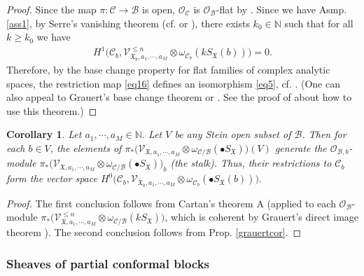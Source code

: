 \documentclass[11pt,b5paper,notitlepage]{article}
\theoremstyle{definition}
\theoremstyle{plain}
\newtheorem{co}[df]{Corollary}
\newcommand{\mc}{\mathcal}
\newcommand{\SV}{\mathscr{V}}
\newcommand{\blt}{\bullet}
\newcommand{\Nbb}{\mathbb N}
\newcommand{\<}{\left\langle}
\renewcommand{\>}{\right\rangle}
\newcommand{\MC}{\mathcal{C}}
\newcommand{\MB}{\mathcal{B}}
\newcommand{\fx}{\mathfrak{X}}
\numberwithin{equation}{section}
\begin{document}
\begin{proof}
Since the map $\pi:\mc C\rightarrow\mc B$ is open, $\mc O_{\mc C}$ is $\mc O_{\mc B}$-flat by \cite[Sec. 3.20]{Fis76}. Since we have Asmp. \ref{ass1}, by Serre's vanishing theorem (cf. \cite[Prop. 5.2.7]{Huy} or \cite[Thm. IV.2.1]{BaSt}), there exists $k_0\in\Nbb$ such that for all $k\geq k_0$ we have
\begin{align}\label{eq14}
H^1\big(\MC_b,\SV_{\fx_b,a_1,\cdots,a_M}^{\leq n}\otimes \omega_{\MC_b}(k S_\fx(b))\big)=0.
\end{align}
Therefore, by the base change property for flat families of complex analytic spaces, the restriction map \eqref{eq16} defines an isomorphism \eqref{eq5}, cf. \cite[Cor. III.3.9]{BaSt}. (One can also appeal to Grauert's base change theorem \cite[Thm. III.4.7]{GPR94} or \cite[Thm. III.4.12]{BaSt}. See the proof of \cite[Thm. 5.5]{Gui-sewingconvergence} about how to use this theorem.)
\end{proof}



\begin{co}\label{grauertcor2}
Let $a_1,\cdots,a_M\in \Nbb$. Let $V$ be any Stein open subset of $\mc B$. Then for each $b\in V$, the elements of $\pi_*\big(\SV_{\fx,a_1,\cdots,a_M}\otimes \omega_{\MC/\MB}(\blt S_\fx)\big)(V)$ generate the  $\mc O_{\mc B,b}$-module  $\pi_*\big(\SV_{\fx,a_1,\cdots,a_M}\otimes \omega_{\MC/\MB}(\blt S_\fx)\big)_b$ (the stalk). Thus, their restrictions to $\MC_b$ form the vector space $H^0\big(\MC_b,\SV_{\fx_b,a_1,\cdots,a_M}\otimes \omega_{\MC_b}(\blt S_\fx(b))\big)$.
\end{co}
\begin{proof}
The first conclusion follows from  Cartan's theorem A (applied to each $\mc O_{\mc B}$-module $\pi_*\big(\SV_{\fx,a_1,\cdots,a_M}^{\leq n}\otimes \omega_{\MC/\MB}(k S_\fx)\big)$, which is coherent by Grauert's direct image theorem \cite[Sec. 10.4]{GR84}). The second conclusion follows from Prop. \ref{grauertcor}.
\end{proof}


\subsubsection{Sheaves of partial conformal blocks}
\end{document}
